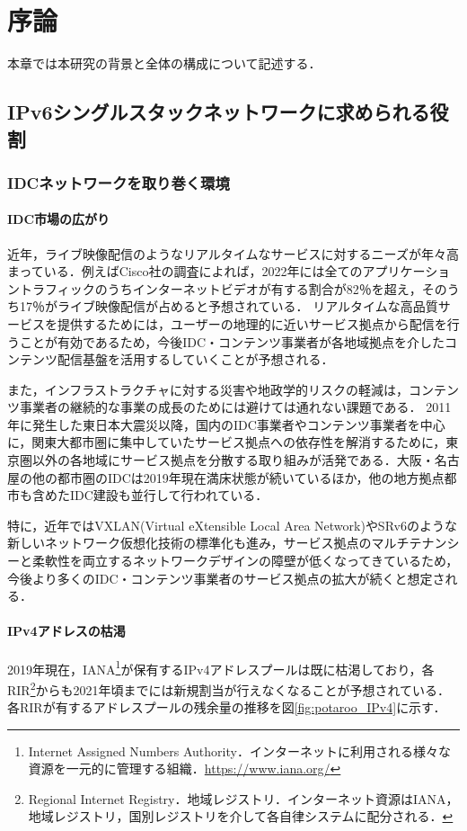 \chapter{序論}
\label{introduction}
本章では本研究の背景と全体の構成について記述する．

\section{IPv6シングルスタックネットワークに求められる役割}
\label{introduction:background}

\subsection{IDCネットワークを取り巻く環境}
\subsubsection{IDC市場の広がり}


近年，ライブ映像配信のようなリアルタイムなサービスに対するニーズが年々高まっている．例えばCisco社の調査\cite{index2017global}によれば，2022年には全てのアプリケーショントラフィックのうちインターネットビデオが有する割合が82％を超え，そのうち17％がライブ映像配信が占めると予想されている．
リアルタイムな高品質サービスを提供するためには，ユーザーの地理的に近いサービス拠点から配信を行うことが有効であるため，今後IDC・コンテンツ事業者が各地域拠点を介したコンテンツ配信基盤を活用するしていくことが予想される．

また，インフラストラクチャに対する災害や地政学的リスクの軽減は，コンテンツ事業者の継続的な事業の成長のためには避けては通れない課題である\cite{alonso2001business}．
2011年に発生した東日本大震災以降，国内のIDC事業者やコンテンツ事業者を中心に，関東大都市圏に集中していたサービス拠点への依存性を解消するために，東京圏以外の各地域にサービス拠点を分散する取り組みが活発である\cite{JANOG44_robust}．大阪・名古屋の他の都市圏のIDCは2019年現在満床状態が続いているほか，他の地方拠点都市も含めたIDC建設も並行して行われている．　

特に，近年ではVXLAN(Virtual eXtensible Local Area Network)\cite{RFC7348}やSRv6\cite{RFC8402}のような新しいネットワーク仮想化技術の標準化も進み，サービス拠点のマルチテナンシーと柔軟性を両立するネットワークデザインの障壁が低くなってきているため，今後より多くのIDC・コンテンツ事業者のサービス拠点の拡大が続くと想定される．


\subsubsection{IPv4アドレスの枯渇}
\label{introduction:background:ipv4_problems}
2019年現在，IANA\footnote{Internet Assigned Numbers Authority．インターネットに利用される様々な資源を一元的に管理する組織．\url{https://www.iana.org/}}が保有するIPv4アドレスプールは既に枯渇しており\cite{IANA_allocation}，各RIR\footnote{Regional Internet Registry．地域レジストリ．インターネット資源はIANA，地域レジストリ，国別レジストリを介して各自律システムに配分される．}からも2021年頃までには新規割当が行えなくなることが予想されている\cite{potaroo_IPv4}．各RIRが有するアドレスプールの残余量の推移を図\ref{fig:potaroo_IPv4}に示す．

